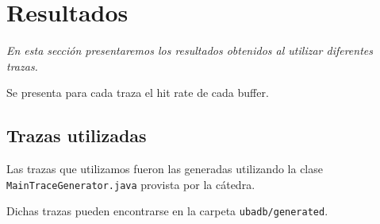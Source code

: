 \section{Resultados}

\textsl{En esta secci\'on presentaremos los resultados obtenidos 
al utilizar diferentes trazas.}

\vspace*{0.3cm}

Se presenta para cada traza el hit rate de cada buffer.

\subsection{Trazas utilizadas}

Las trazas que utilizamos fueron las generadas utilizando la
clase \texttt{MainTraceGenerator.java} provista por la cátedra.


Dichas trazas pueden encontrarse en la carpeta 
\texttt{ubadb/generated}.